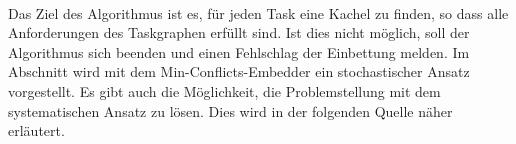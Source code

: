 \ \\
Das Ziel des Algorithmus ist es, für jeden Task eine Kachel zu finden, so dass alle Anforderungen des Taskgraphen erfüllt sind. Ist dies nicht möglich, soll der Algorithmus sich beenden und einen Fehlschlag der Einbettung melden. Im Abschnitt  wird mit dem Min-Conflicts-Embedder ein stochastischer Ansatz vorgestellt. Es gibt auch die Möglichkeit, die Problemstellung mit dem systematischen Ansatz zu lösen. Dies wird in der folgenden Quelle näher erläutert.

